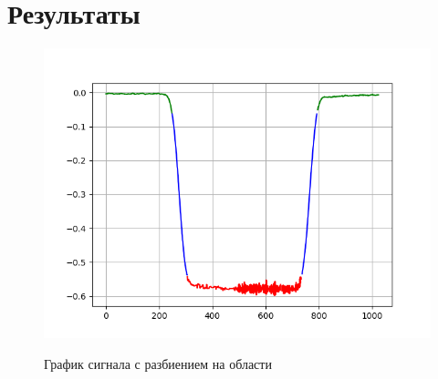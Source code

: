 \documentclass[12pt,a4paper]{article}
\begin{document}
	\section{Результаты}
	\begin{figure}[hpt]
		{\includegraphics[width=1\linewidth]{../plots/plot.png}}
		\caption{График сигнала с разбиением на области}
	\end{figure}
\end{document}
